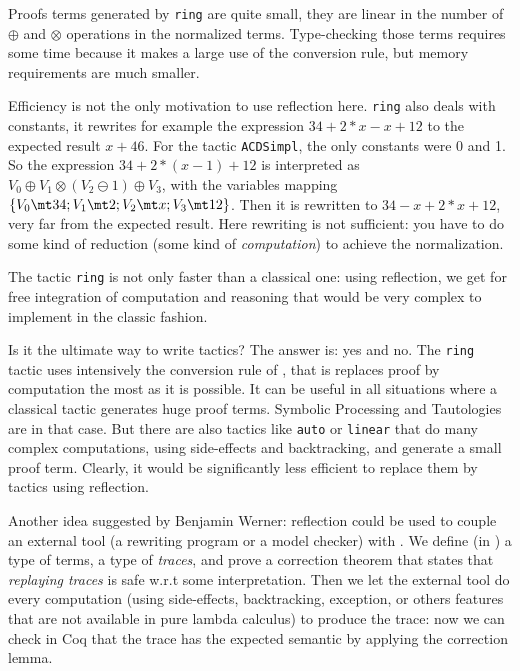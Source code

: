 Proofs terms generated by \texttt{ring} are quite small, they are
linear in the number of $\oplus$ and $\otimes$ operations in the
normalized terms. Type-checking those terms requires some time because it
makes a large use of the conversion rule, but
memory requirements are much smaller.

\label{DiscussReflection}

Efficiency is not the only motivation to use reflection
here. \texttt{ring} also deals with constants, it rewrites for example the
expression $34 + 2*x -x + 12$ to the expected result $x + 46$. For the
tactic \texttt{ACDSimpl}, the only constants were 0 and 1. So the
expression $34 + 2*(x - 1) + 12$ is interpreted as
$V_0 \oplus V_1 \otimes (V_2 \ominus 1) \oplus V_3$,
with the variables mapping
$\{V_0 \mt 34; V_1 \mt 2; V_2 \mt x; V_3 \mt 12 \}$. Then it is
rewritten to $34 - x + 2*x + 12$, very far from the expected
result. Here rewriting is not sufficient: you have to do some kind of
reduction (some kind of \textit{computation}) to achieve the
normalization.

The tactic \texttt{ring} is not only faster than a classical one:
using reflection, we get for free integration of computation and
reasoning that would be very complex to implement in the classic fashion.

Is it the ultimate way to write tactics?  The answer is: yes and
no. The \texttt{ring} tactic uses intensively the conversion rule of
\CIC, that is replaces proof by computation the most as it is
possible. It can be useful in all situations where a classical tactic
generates huge proof terms. Symbolic Processing and Tautologies are in
that case. But there are also tactics like \texttt{auto} or
\texttt{linear} that do many complex computations, using side-effects
and backtracking, and generate a small proof term. Clearly, it would
be significantly less efficient to replace them by tactics using
reflection.

Another idea suggested by Benjamin Werner: reflection could be used to
couple an external tool (a rewriting program or a model checker) with
\Coq. We define (in \Coq) a type of terms, a type of \emph{traces},
and prove a correction theorem that states that \emph{replaying
traces} is safe w.r.t some interpretation. Then we let the external
tool do every computation (using side-effects, backtracking,
exception, or others features that are not available in pure lambda
calculus) to produce the trace: now we can check in Coq{} that the
trace has the expected semantic by applying the correction lemma.

